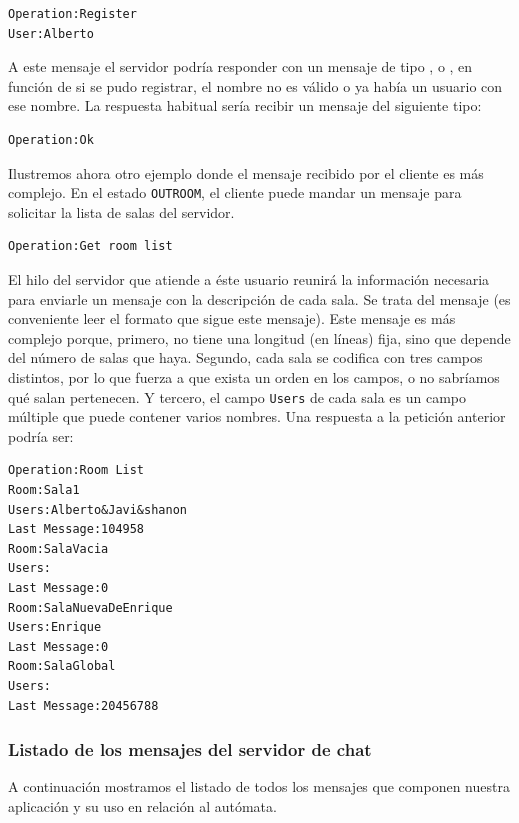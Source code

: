\begin{lstlisting}
Operation:Register
User:Alberto

\end{lstlisting}

A este mensaje el servidor podría responder con un mensaje de tipo ,  o , en función de si se pudo registrar, el nombre no es válido o ya había un usuario con ese nombre. La respuesta habitual sería recibir un mensaje del siguiente tipo:

\begin{lstlisting}
Operation:Ok

\end{lstlisting}

Ilustremos ahora otro ejemplo donde el mensaje recibido por el cliente es más complejo. En el estado \lstinline{OUTROOM}, el cliente puede mandar un mensaje  para solicitar la lista de salas del servidor.

\begin{lstlisting}
Operation:Get room list

\end{lstlisting}

El hilo del servidor que atiende a éste usuario reunirá la información necesaria para enviarle un mensaje con la descripción de cada sala. Se trata del mensaje  (es conveniente leer el formato que sigue este mensaje). Este mensaje es más complejo porque, primero, no tiene una longitud (en líneas) fija, sino que depende del número de salas que haya. Segundo, cada sala se codifica con tres campos distintos, por lo que fuerza a que exista un orden en los campos, o no sabríamos qué salan pertenecen. Y tercero, el campo \lstinline{Users} de cada sala es un campo múltiple que puede contener varios nombres. Una respuesta a la petición anterior podría ser:

\begin{lstlisting}
Operation:Room List
Room:Sala1
Users:Alberto&Javi&shanon
Last Message:104958
Room:SalaVacia
Users:
Last Message:0
Room:SalaNuevaDeEnrique
Users:Enrique
Last Message:0
Room:SalaGlobal
Users:
Last Message:20456788

\end{lstlisting}
\subsubsection{Listado de los mensajes del servidor de chat}
A continuación mostramos el listado de todos los mensajes que componen nuestra aplicación y su uso en relación al autómata.



